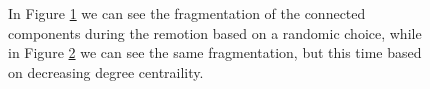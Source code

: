         \begin{figure}[H]
            \centering
            \begin{subfigure}{0.45\textwidth}
                \caption{}
                \label{test_cc_on_random}
            \end{subfigure}
            \begin{subfigure}{0.45\textwidth}
                \caption{}
                \label{test_cc_on_degree_centrality}
            \end{subfigure}
            \caption{In Figure \ref{test_cc_on_random} we can see the fragmentation of the connected components
            during the remotion based on a randomic choice, while in Figure \ref{test_cc_on_degree_centrality} we
            can see the same fragmentation, but this time based on decreasing degree centraility.}
            \label{test_cc}
        \end{figure}

